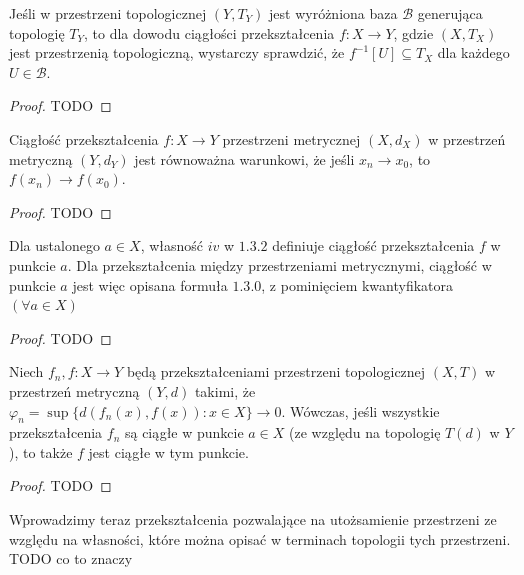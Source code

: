 \begin{remark}[1.3.3]
	Jeśli w przestrzeni topologicznej $\left( Y, T_{Y} \right) $ jest wyróżniona baza $\mathcal{B}$ generująca topologię $T_{Y}$, to dla dowodu ciągłości przekształcenia $f : X \to Y$, gdzie $\left( X,T_{X} \right) $ jest przestrzenią topologiczną, wystarczy sprawdzić, że $f^{-1}\left[ U \right] \subseteq T_{X}$ dla każdego  $U \in \mathcal{B}$.
\end{remark} 
\begin{proof}
	TODO
\end{proof} 
\begin{remark}[1.3.4]
	Ciągłość przekształcenia $f: X\to Y$ przestrzeni metrycznej $\left( X, d_{X} \right) $ w przestrzeń metryczną $\left( Y,d_{Y} \right) $ jest równoważna warunkowi, że jeśli $x_{n}\to x_0$, to $f\left( x_{n}  \right) \to f\left( x_0 \right) $.
\end{remark} 
\begin{proof}
	TODO
\end{proof} 
\begin{remark}[1.3.5 A]
	Dla ustalonego $a \in X$, własność $iv$ w $1.3.2$ definiuje ciągłość przekształcenia $f$ w punkcie $a$. Dla przekształcenia między przestrzeniami metrycznymi, ciągłość w punkcie $a$ jest więc opisana formuła $1.3.0$, z pominięciem kwantyfikatora $\left(\forall a \in X \right) $
\end{remark} 
\begin{proof}
	TODO
\end{proof} 
\begin{remark}[1.3.5 B]
	Niech $f_{n} , f : X \to Y$ będą przekształceniami przestrzeni topologicznej $\left( X,T \right) $ w przestrzeń metryczną $\left( Y,d \right) $ takimi, że $\varphi_{n} = \sup \{d\left( f_{n} \left( x \right) , f\left( x \right)  \right) : x \in X\} \longrightarrow 0 $. Wówczas, jeśli wszystkie przekształcenia $f_{n} $ są ciągłe w punkcie $a \in X$ (ze względu na topologię $T\left( d \right) $ w $Y$ ), to także $f$ jest ciągłe w tym punkcie.
\end{remark} 
\begin{proof}
	TODO
\end{proof} 

Wprowadzimy teraz przekształcenia pozwalające na utożsamienie przestrzeni ze względu na własności, które można opisać w terminach topologii tych przestrzeni. TODO co to znaczy

